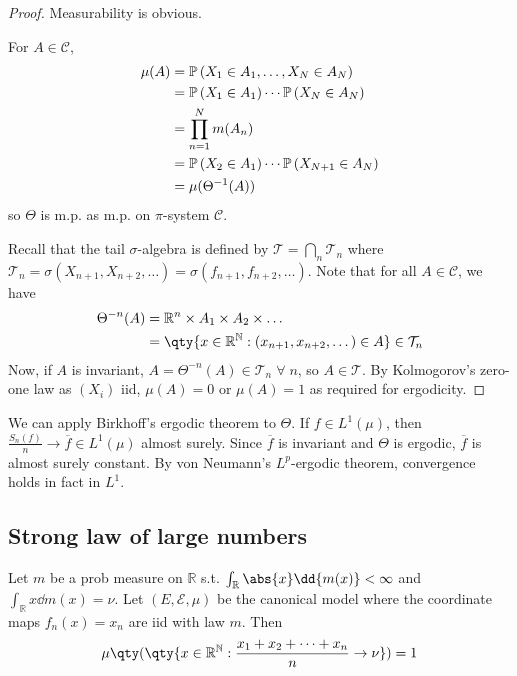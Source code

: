 \begin{proof}
	Measurability is obvious.

	For $A \in \mathcal C$,
	\begin{align*}
			\mu(A) &= \mathbb{P}\left({X_1 \in A_1, \dots, X_N \in A_N}\right) \\
			&= \mathbb{P}\left({X_1 \in A_1}\right) \cdots \mathbb{P}\left({X_N \in A_N}\right) \\
			&= \prod_{n=1}^N m(A_n) \\
			&= \mathbb{P}\left({X_2 \in A_1}\right) \cdots \mathbb{P}\left({X_{N+1} \in A_N}\right) \\
			&= \mu(\Theta^{-1}(A))
	\end{align*}
	so $\Theta$ is m.p. as m.p. on $\pi$-system $\mathcal{C}$.

	Recall that the tail $\sigma$-algebra is defined by $\mathcal T = \bigcap_n \mathcal T_n$ where $\mathcal T_n = \sigma(X_{n+1}, X_{n+2}, \dots) = \sigma(f_{n+1}, f_{n+2}, \dots)$.
	Note that for all $A \in \mathcal C$, we have
	\begin{align*}
        \Theta^{-n}(A) &= \mathbb{R}^n \times A_1 \times A_2 \times \dots \\
		&= \qty{x \in \mathbb R^{\mathbb N} : (x_{n+1}, x_{n+2}, \dots) \in A} \in \mathcal T_n
    \end{align*}
	Now, if $A$ is invariant, $A = \Theta^{-n}(A) \in \mathcal T_n \; \forall \; n$, so $A \in \mathcal T$.
	By Kolmogorov's zero-one law as $(X_i)$ iid, $\mu(A) = 0$ or $\mu(A) = 1$ as required for ergodicity.
\end{proof}
We can apply Birkhoff's ergodic theorem to $\Theta$.
If $f \in L^1(\mu)$, then $\frac{S_n(f)}{n} \to \overline f \in L^1(\mu)$ almost surely.
Since $\overline f$ is invariant and $\Theta$ is ergodic, $\overline f$ is almost surely constant.
By von Neumann's $L^p$-ergodic theorem, convergence holds in fact in $L^1$.

\subsection{Strong law of large numbers}

\begin{theorem} \label{thm:canonical}
	Let $m$ be a prob measure on $\mathbb{R}$ s.t. $\int_{\mathbb R} \abs{x} \dd{m(x)} < \infty$ and $\int_{\mathbb R} x \dd{m(x)} = \nu$.
	Let $(E, \mathcal{E}, \mu)$ be the canonical model where the coordinate maps $f_n(x) = x_n$ are iid with law $m$.
	Then
	\begin{align*}
        \mu\qty(\qty{x \in \mathbb R^{\mathbb N} : \frac{x_1 + x_2 + \dots + x_n}{n} \to \nu}) = 1
    \end{align*}
\end{theorem}

